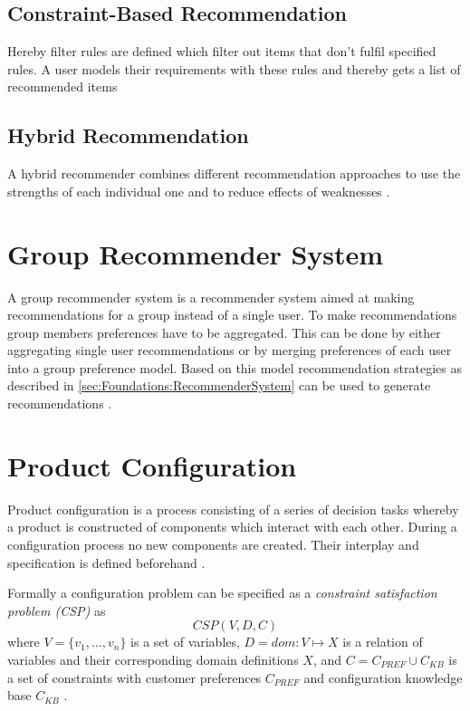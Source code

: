\subsection{Constraint-Based Recommendation}
Hereby filter rules are defined which filter out items that don't fulfil specified rules. A user models their requirements with these rules and thereby gets a list of recommended items \cite[~ p. 12]{felfernigDecisionTasksBasic2018}

\subsection{Hybrid Recommendation}
A hybrid recommender combines different recommendation approaches to use the strengths of each individual one and to reduce effects of weaknesses \cite{burkeHybridRecommenderSystems2002}.


\section{Group Recommender System}

A group recommender system is a recommender system aimed at making recommendations for a group instead of a single user. To make recommendations group members preferences have to be aggregated. This can be done by either aggregating single user recommendations or by merging preferences of each user into a group preference model. Based on this model recommendation strategies as described in \ref{sec:Foundations:RecommenderSystem} can be used to generate recommendations \cite{jamesonRecommendationGroups2007}.

\section{Product Configuration}
\label{sec:Foundations:ProductConfiguration}

Product configuration is a process consisting of a series of decision tasks whereby a product is constructed of components which interact with each other. During a configuration process no new components are created. Their interplay and specification is defined beforehand \cite[~ pp. 42, 43]{sabinProductConfigurationFrameworksa1998}.

Formally a configuration problem can be specified as a \emph{constraint satisfaction problem (CSP)} \cite{tsangFoundationsConstraintSatisfaction1993} as 
\[
    CSP(V,D,C)
\]
where \( V = \{v_1,\dots, v_n\} \) is a set of variables, \( D = dom : V \mapsto X \) is a relation of variables and their corresponding domain definitions \( X \), and \( C = C_{PREF} \cup C_{KB} \) is a set of constraints with customer preferences \( C_{PREF} \) and configuration knowledge base \( C_{KB} \) \cite{felferningGroupBasedConfiguration2016, felfernigOpenConfiguration2014}.


